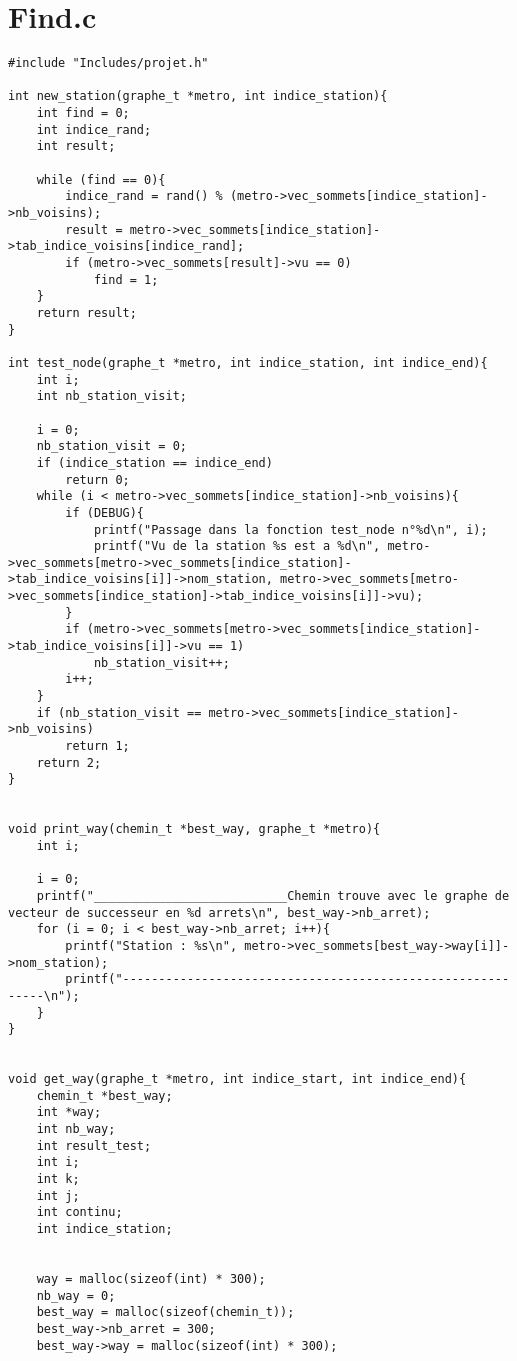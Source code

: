 \documentclass[12pt, twoside]{report}
\begin{document}
\section{Find.c}
\begin{verbatim}
#include "Includes/projet.h"

int new_station(graphe_t *metro, int indice_station){
	int find = 0;
	int indice_rand;
	int result;

	while (find == 0){
		indice_rand = rand() % (metro->vec_sommets[indice_station]->nb_voisins);
		result = metro->vec_sommets[indice_station]->tab_indice_voisins[indice_rand];
		if (metro->vec_sommets[result]->vu == 0)
			find = 1;
	}
	return result;
}

int test_node(graphe_t *metro, int indice_station, int indice_end){
	int i;
	int nb_station_visit;

	i = 0;
	nb_station_visit = 0;
	if (indice_station == indice_end)
		return 0;
	while (i < metro->vec_sommets[indice_station]->nb_voisins){
		if (DEBUG){
			printf("Passage dans la fonction test_node n°%d\n", i);
			printf("Vu de la station %s est a %d\n", metro->vec_sommets[metro->vec_sommets[indice_station]->tab_indice_voisins[i]]->nom_station, metro->vec_sommets[metro->vec_sommets[indice_station]->tab_indice_voisins[i]]->vu);
		}
		if (metro->vec_sommets[metro->vec_sommets[indice_station]->tab_indice_voisins[i]]->vu == 1)
			nb_station_visit++;
		i++;
	}
	if (nb_station_visit == metro->vec_sommets[indice_station]->nb_voisins)
		return 1;
	return 2;
}


void print_way(chemin_t *best_way, graphe_t *metro){
	int i;

	i = 0;
	printf("___________________________Chemin trouve avec le graphe de vecteur de successeur en %d arrets\n", best_way->nb_arret);
	for (i = 0; i < best_way->nb_arret; i++){
		printf("Station : %s\n", metro->vec_sommets[best_way->way[i]]->nom_station);
		printf("-----------------------------------------------------------\n");
	}
}


void get_way(graphe_t *metro, int indice_start, int indice_end){
	chemin_t *best_way;
	int *way;
	int nb_way;
	int result_test;
	int i;
	int k;
	int j;
	int continu;
	int indice_station;


	way = malloc(sizeof(int) * 300);
	nb_way = 0;
	best_way = malloc(sizeof(chemin_t));
	best_way->nb_arret = 300;
	best_way->way = malloc(sizeof(int) * 300);



\end{verbatim}
\end{document}
